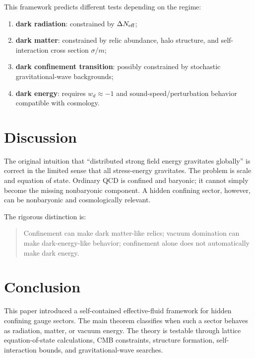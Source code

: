 \documentclass[11pt]{article}
\theoremstyle{remark}
\begin{document}
This framework predicts different tests depending on the regime:
\begin{enumerate}[label=(\roman*)]
\item \textbf{dark radiation}: constrained by $\Delta N_{\rm eff}$;
\item \textbf{dark matter}: constrained by relic abundance, halo structure, and self-interaction cross section $\sigma/m$;
\item \textbf{dark confinement transition}: possibly constrained by stochastic gravitational-wave backgrounds;
\item \textbf{dark energy}: requires $w_d\approx-1$ and sound-speed/perturbation behavior compatible with cosmology.
\end{enumerate}

\section{Discussion}

The original intuition that ``distributed strong field energy gravitates globally'' is correct in the limited sense that all stress-energy gravitates. The problem is scale and equation of state. Ordinary QCD is confined and baryonic; it cannot simply become the missing nonbaryonic component. A hidden confining sector, however, can be nonbaryonic and cosmologically relevant.

The rigorous distinction is:
\begin{quote}
Confinement can make dark matter-like relics; vacuum domination can make dark-energy-like behavior; confinement alone does not automatically make dark energy.
\end{quote}

\section{Conclusion}

This paper introduced a self-contained effective-fluid framework for hidden confining gauge sectors. The main theorem classifies when such a sector behaves as radiation, matter, or vacuum energy. The theory is testable through lattice equation-of-state calculations, CMB constraints, structure formation, self-interaction bounds, and gravitational-wave searches.
\end{document}
